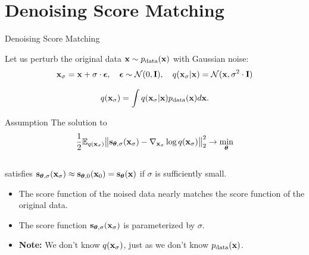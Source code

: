 \documentclass{beamer}
\renewcommand{\eqpause}{}
\begin{document}
\section{Denoising Score Matching}
\begin{frame}{Denoising Score Matching}

	Let us perturb the original data $\mathbf{x} \sim p_{\text{data}}(\mathbf{x})$ with Gaussian noise:
	\vspace{-0.3cm}
	\[
		\mathbf{x}_{\sigma} = \mathbf{x} + \sigma \cdot \boldsymbol{\epsilon}, \quad \boldsymbol{\epsilon} \sim \mathcal{N}(0, \mathbf{I}), \quad q(\mathbf{x}_{\sigma} | \mathbf{x}) = \mathcal{N}(\mathbf{x}, \sigma^2 \cdot \mathbf{I})
	\]
	\eqpause
	\vspace{-0.4cm}
	\[
		q(\mathbf{x}_{\sigma}) = \int q(\mathbf{x}_{\sigma} | \mathbf{x}) p_{\text{data}}(\mathbf{x}) d\mathbf{x}.
	\]
	\eqpause
	\vspace{-0.5cm}
	\begin{block}{Assumption}
		The solution to
		\[
			\frac{1}{2} \mathbb{E}_{q(\mathbf{x}_{\sigma})}\big\| \mathbf{s}_{\boldsymbol{\theta}, \sigma}(\mathbf{x}_{\sigma}) - \nabla_{\mathbf{x}_{\sigma}} \log q(\mathbf{x}_{\sigma}) \big\|^2_2 \rightarrow \min_{\boldsymbol{\theta}}
		\]
		\vspace{-0.3cm} \\
		satisfies $\mathbf{s}_{\boldsymbol{\theta}, \sigma}(\mathbf{x}_{\sigma}) \approx \mathbf{s}_{\boldsymbol{\theta}, 0}(\mathbf{x}_0) = \mathbf{s}_{\boldsymbol{\theta}}(\mathbf{x})$ if $\sigma$ is sufficiently small.
	\end{block}
	\eqpause
	\begin{itemize}
		\item The score function of the noised data nearly matches the score function of the original data.
		\item The score function $\mathbf{s}_{\boldsymbol{\theta}, \sigma}(\mathbf{x}_{\sigma})$ is parameterized by $\sigma$.
		\item \textbf{Note:} We don't know $q(\mathbf{x}_{\sigma})$, just as we don't know $p_{\text{data}}(\mathbf{x})$.
	\end{itemize}
\end{frame}
\end{document}
